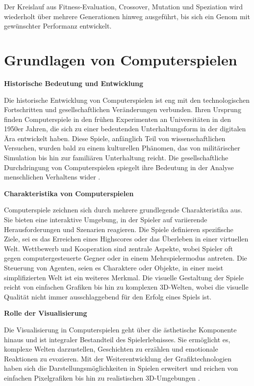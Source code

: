 Der Kreislauf aus Fitness-Evaluation, Crossover, Mutation und Speziation wird wiederholt über mehrere Generationen hinweg ausgeführt, bis sich ein Genom mit gewünschter Performanz entwickelt. 


\section{Grundlagen von Computerspielen}

\textbf{Historische Bedeutung und Entwicklung}

Die historische Entwicklung von Computerspielen ist eng mit den technologischen Fortschritten und gesellschaftlichen Veränderungen verbunden. Ihren Ursprung finden Computerspiele in den frühen Experimenten an Universitäten in den 1950er Jahren, die sich zu einer bedeutenden Unterhaltungsform in der digitalen Ära entwickelt haben. Diese Spiele, anfänglich Teil von wissenschaftlichen Versuchen, wurden bald zu einem kulturellen Phänomen, das von militärischer Simulation bis hin zur familiären Unterhaltung reicht. Die gesellschaftliche Durchdringung von Computerspielen spiegelt ihre Bedeutung in der Analyse menschlichen Verhaltens wider \cite{Huizinga1939}.

\textbf{Charakteristika von Computerspielen}

Computerspiele zeichnen sich durch mehrere grundlegende Charakteristika aus. Sie bieten eine interaktive Umgebung, in der Spieler auf variierende Herausforderungen und Szenarien reagieren. Die Spiele definieren spezifische Ziele, sei es das Erreichen eines Highscores oder das Überleben in einer virtuellen Welt. Wettbewerb und Kooperation sind zentrale Aspekte, wobei Spieler oft gegen computergesteuerte Gegner oder in einem Mehrspielermodus antreten. Die Steuerung von Agenten, seien es Charaktere oder Objekte, in einer meist simplifizierten Welt ist ein weiteres Merkmal. Die visuelle Gestaltung der Spiele reicht von einfachen Grafiken bis hin zu komplexen 3D-Welten, wobei die visuelle Qualität nicht immer ausschlaggebend für den Erfolg eines Spiels ist.

\textbf{Rolle der Visualisierung}

Die Visualisierung in Computerspielen geht über die ästhetische Komponente hinaus und ist integraler Bestandteil des Spielerlebnisses. Sie ermöglicht es, komplexe Welten darzustellen, Geschichten zu erzählen und emotionale Reaktionen zu evozieren. Mit der Weiterentwicklung der Grafiktechnologien haben sich die Darstellungsmöglichkeiten in Spielen erweitert und reichen von einfachen Pixelgrafiken bis hin zu realistischen 3D-Umgebungen \cite{COMP}.

